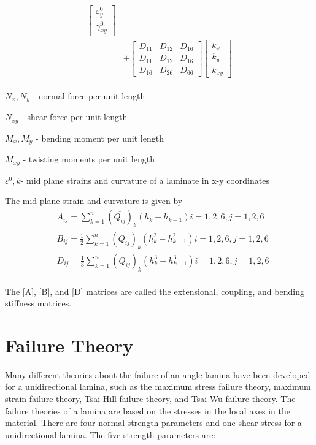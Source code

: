 \documentclass[Afour,sagev,times]{sagej}
\begin{document}
\begin{equation}
\begin{array}{l}
\begin{aligned}
\begin{bmatrix}
        \varepsilon_y^0 \\
		\gamma_{xy}^0
    \end{bmatrix} \\ 
	&+  
	\begin{bmatrix}
		D_{11} & D_{12} & D_{16} \\
		D_{11} & D_{12} & D_{16} \\
		D_{16} & D_{26} & D_{66} 
	\end{bmatrix}
	\begin{bmatrix}
		k_x \\
		k_y \\
		k_{xy} 
	\end{bmatrix}
\end{aligned}
	\end{array}
\end{equation}


$N_x,N_y $  - normal force per unit length

$N_{xy} $  - shear force per unit length

$M_x, M_y $ - bending moment per unit length

$M_{xy} $  - twisting moments per unit length

$\varepsilon^{0}, k $- mid plane strains and curvature of a laminate in x-y coordinates

The mid plane strain and curvature is given by
\begin{equation}
    \begin{split}
    &A_{ij}=\sum_{k=1}^{n}(\overline{Q_{ij}})_k(h_k-h_{k-1})  i=1,2,6, j=1,2,6\\
    &B_{ij}=\frac{1}{2}\sum_{k=1}^{n}(\overline{Q_{ij}})_k(h^2_k - h_{k-1}^2)  i=1,2,6, j=1,2,6\\
    &D_{ij}=\frac{1}{3}\sum_{k=1}^{n}(\overline{Q_{ij}})_k(h^3_k - h_{k-1}^3) i=1,2,6, j=1,2,6\\
    \end{split}
\end{equation}

The [A], [B], and [D] matrices are called the extensional, coupling, and bending stiffness matrices.

\section{Failure Theory}
Many different theories about the failure of an angle lamina have been developed for a
unidirectional lamina, such as the maximum stress failure theory, maximum strain failure theory,
Tsai-Hill failure theory, and Tsai-Wu failure theory. The failure theories of a lamina are based on
the stresses in the local axes in the material. There are four normal strength parameters and one shear
stress for a unidirectional lamina. The five strength parameters are:
\end{document}

